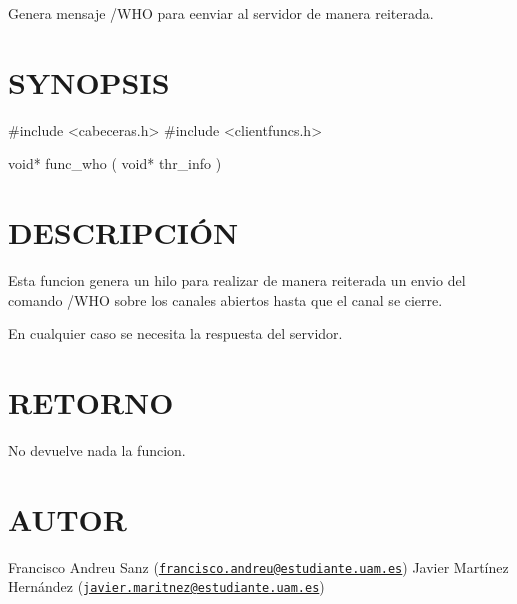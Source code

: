 Genera mensaje /\-W\-H\-O para eenviar al servidor de manera reiterada.\hypertarget{unknown_case_SYNOPSIS}{}\section{S\-Y\-N\-O\-P\-S\-I\-S}\label{unknown_case_SYNOPSIS}
\begin{DoxyVerb} #include  <cabeceras.h>
   #include  <clientfuncs.h>

 void* func_who ( void* thr_info )
\end{DoxyVerb}
\hypertarget{unknown_case_descripcion}{}\section{D\-E\-S\-C\-R\-I\-P\-C\-IÓ\-N}\label{unknown_case_descripcion}
Esta funcion genera un hilo para realizar de manera reiterada un envio del comando /\-W\-H\-O sobre los canales abiertos hasta que el canal se cierre.

En cualquier caso se necesita la respuesta del servidor.\hypertarget{unknown_case_retorno}{}\section{R\-E\-T\-O\-R\-N\-O}\label{unknown_case_retorno}
No devuelve nada la funcion.\hypertarget{unknown_case_authors}{}\section{A\-U\-T\-O\-R}\label{unknown_case_authors}
Francisco Andreu Sanz (\href{mailto:francisco.andreu@estudiante.uam.es}{\tt francisco.\-andreu@estudiante.\-uam.\-es}) Javier Martínez Hernández (\href{mailto:javier.maritnez@estudiante.uam.es}{\tt javier.\-maritnez@estudiante.\-uam.\-es}) 

 
